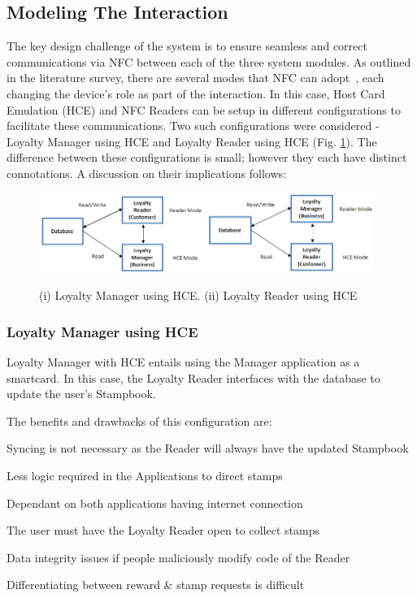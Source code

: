 \subsection{Modeling The Interaction}
The key design challenge of the system is to ensure seamless and correct communications via NFC between each of the three system modules. As outlined in the literature survey, there are several modes that NFC can adopt~\cite{MODESOFOPERATION}, each changing the device's role as part of the interaction. In this case, Host Card Emulation (HCE) and NFC Readers can be setup in different configurations to facilitate these communications. Two such configurations were considered - Loyalty Manager using HCE and Loyalty Reader using HCE (Fig. \ref{fig:dArches}). The difference between these configurations is small; however they each have distinct connotations. A discussion on their implications follows:

\begin{figure}[H]
 \centering
  \includegraphics[width=0.48\textwidth]{img/dArch1.png}
   \includegraphics[width=0.48\textwidth]{img/dArch2.png}
    \caption{(i) Loyalty Manager using HCE. (ii) Loyalty Reader using HCE}
     \label{fig:dArches}
\end{figure}

\subsubsection{Loyalty Manager using HCE}
Loyalty Manager with HCE entails using the Manager application as a smartcard. In this case, the Loyalty Reader interfaces with the database to update the user's Stampbook. 

The benefits and drawbacks of this configuration are: 
\begin{description}[leftmargin=!,labelwidth=\widthof{\bfseries small}]
    \item[+] Syncing is not necessary as the Reader will always have the updated Stampbook
    \item[+] Less logic required in the Applications to direct stamps
    \item[---] Dependant on both applications having internet connection
    \item[---] The user must have the Loyalty Reader open to collect stamps
    \item[---] Data integrity issues if people maliciously modify code of the Reader
    \item[---] Differentiating between  reward \& stamp requests is difficult
\end{description}
